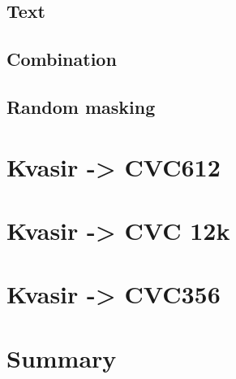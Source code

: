     \subsection{Text}
    \subsection{Combination}
    \subsection{Random masking}
    
\section{Kvasir -> CVC612}
\section{Kvasir -> CVC 12k}
\section{Kvasir -> CVC356}

\section{Summary
}
